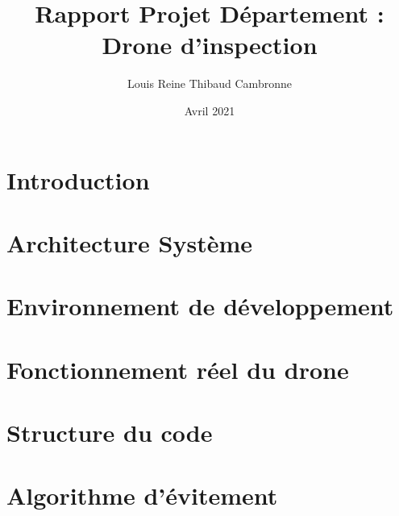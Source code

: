 \documentclass{article}
\title{Rapport Projet Département : Drone d'inspection}
\author{Louis Reine Thibaud Cambronne }
\date{Avril 2021}
\begin{document}
\maketitle

\section{Introduction}
\section{Architecture Système}
\section{Environnement de développement}
\section{Fonctionnement réel du drone}
\section{Structure du code}
\section{Algorithme d'évitement}
\end{document}
